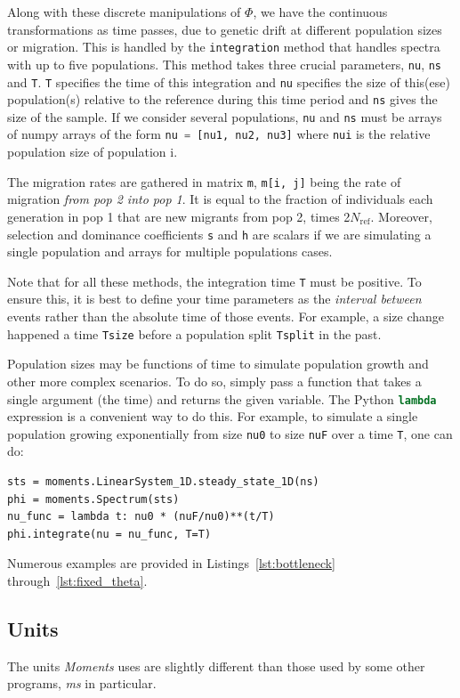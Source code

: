 \documentclass[12pt]{article}
\makeatletter
\newcommand{\Nref}{\ensuremath{N_\text{ref}}\xspace}
\newcommand{\ms}{\emph{ms}\xspace}
\newcommand{\py}[1]{\lstinline[breaklines=true,language=Python, showstringspaces=False]@#1@}
\makeatother
\begin{document}
Along with these discrete manipulations of $\Phi$, we have the continuous transformations as time passes, due to genetic drift at different population sizes or migration.
This is handled by the \py{integration} method that handles spectra with up to five populations.
This method takes three crucial parameters, \py{nu}, \py{ns} and \py{T}.
\py{T} specifies the time of this integration and \py{nu} specifies the size of this(ese) population(s) relative to the reference during this time period and \py{ns} gives the size of the sample. If we consider several populations, \py{nu} and \py{ns} must be arrays of numpy arrays of the form \py{nu = [nu1, nu2, nu3]} where \py{nui} is the relative population size of population i.

The migration rates are gathered in matrix \py{m}, \py{m[i, j]} being the rate of migration \emph{from pop 2 into pop 1}. 
It is equal to the fraction of individuals each generation in pop 1 that are new migrants from pop 2, times 2\Nref. Moreover, selection and dominance coefficients \py{s} and \py{h} are scalars if we are simulating a single population and arrays for multiple populations cases. 

Note that for all these methods, the integration time \py{T} must be positive.
To ensure this, it is best to define your time parameters as the \emph{interval between} events rather than the absolute time of those events.
For example, a size change happened a time \py{Tsize} before a population split \py{Tsplit} in the past.

Population sizes may be functions of time to simulate population growth and other more complex scenarios.
To do so, simply pass a function that takes a single argument (the time) and returns the given variable.
The Python \py{lambda} expression is a convenient way to do this.
For example, to simulate a single population growing exponentially from size \py{nu0} to size \py{nuF} over a time \py{T}, one can do:
\begin{lstlisting}
sts = moments.LinearSystem_1D.steady_state_1D(ns)
phi = moments.Spectrum(sts) 
nu_func = lambda t: nu0 * (nuF/nu0)**(t/T)
phi.integrate(nu = nu_func, T=T)
\end{lstlisting}

Numerous examples are provided in Listings~\ref{lst:bottleneck} through~\ref{lst:fixed_theta}.

\subsection{Units}
The units \textit{Moments} uses are slightly different than those used by some other programs, \ms in particular.
\end{document}
